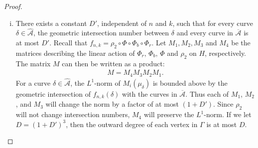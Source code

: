 \begin{proof}
\begin{enumerate}[(i)]
\item There exists a constant $D'$, independent of $n$ and $k$, such that for every curve $\delta \in \widehat{\mathcal{A}}$, the geometric
  intersection number between $\delta$ and every curve in $\overline{\mathcal{A}}$ is at most $D'$.  %
  Recall that $f_{n,k}=\rho_2\circ\Phi\circ\Phi_b\circ\Phi_r$.  Let $M_1,M_2,M_3$ and $M_4$ be the matrices describing the linear action of $\Phi_r,\,\Phi_b,\,\Phi$ and $\rho_2$ on $H$, respectively. The matrix
  $M$ can then be written as a product:
  \begin{align*}
    M = M_4M_3M_2M_1.
  \end{align*}
  For a curve $\delta \in \widehat{\mathcal{A}}$, the $L^1$-norm of $M_i(\mu_\delta)$ is bounded above by the geometric intersection of
  $f_{n,k}(\delta)$ with the curves in $\overline{\mathcal{A}}$.  Thus each of $M_1$, $M_2$, and $M_3$ will change the norm by
  a factor of at most $(1 + D')$. Since $\rho_2$ will not change intersection numbers, $M_4$ will preserve the
  $L^1$-norm. If we let $D = (1 + D')^3$, then the outward degree of each vertex in $\Gamma$ is at most $D$.


\end{enumerate}
\end{proof}
